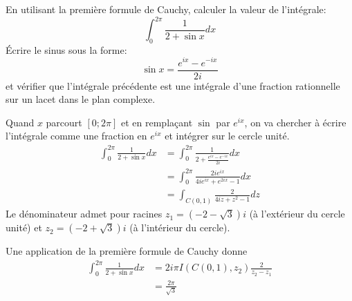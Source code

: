 \begin{fex}
    En utilisant la première formule de Cauchy, calculer la valeur de l'intégrale:
    \[
    \int_0^{2\pi} \frac{1}{2 + \sin x} dx
    \]
    Écrire le sinus sous la forme:
    \[
\sin x =\frac{e^{ix}-e^{-ix}}{2i}
    \]
    et vérifier que l'intégrale précédente est une intégrale d'une fraction rationnelle sur un lacet dans le plan
    complexe.
\end{fex} 
Quand $x$ parcourt $[0;2\pi]$ et en remplaçant $\sin$ par $e^{ix}$, on va chercher à écrire l'intégrale comme une fraction en $e^{ix}$ et intégrer sur le cercle unité. 
\begin{align*} 
    \int_0^{2\pi} \frac{1}{2 + \sin x} dx 
    &= \int_0^{2\pi} \frac{1}{2 + \frac{e^{ix}-e^{-ix}}{2i}} dx \\ 
    &= \int_0^{2\pi} \frac{2ie^{ix}}{4ie^{ix} + e^{2ix}-1} dx \\  
    &= \int_{C(0,1)} \frac{2}{4iz + z^2 - 1} dz 
\end{align*} 
Le dénominateur admet pour racines $z_1 = (-2-\sqrt{3})i$ (à l'extérieur du cercle unité) et $z_2 = (-2+\sqrt{3})i$ (à l'intérieur du cercle). 

Une application de la première formule de Cauchy donne 
\begin{align*} 
    \int_0^{2\pi} \frac{1}{2 + \sin x} dx 
    &= 2i \pi I(C(0,1), z_2) \frac{2}{z_2-z_1} \\ 
    &= \frac{2\pi}{\sqrt{3}} 
\end{align*} 